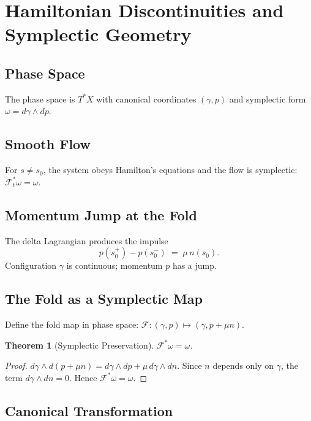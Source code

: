 \documentclass[12pt, oneside]{book}
\theoremstyle{plain}
\newtheorem{theorem}{Theorem}[section]
\theoremstyle{definition}
\theoremstyle{remark}
\begin{document}
\section{Hamiltonian Discontinuities and Symplectic Geometry}

\subsection{Phase Space}

The phase space is $T^*X$ with canonical coordinates $(\gamma, p)$
and symplectic form $\omega = d\gamma \wedge dp$.

\subsection{Smooth Flow}

For $s \ne s_0$, the system obeys Hamilton's equations and the flow
is symplectic: $\mathcal{F}_t^*\omega = \omega$.

\subsection{Momentum Jump at the Fold}

The delta Lagrangian produces the impulse
\[
p(s_0^+) - p(s_0^-) \;=\; \mu\,n(s_0).
\]
Configuration $\gamma$ is continuous; momentum $p$ has a jump.

\subsection{The Fold as a Symplectic Map}

Define the fold map in phase space:
$\mathcal{F} : (\gamma, p) \mapsto (\gamma, p + \mu n)$.

\begin{theorem}[Symplectic Preservation]
$\mathcal{F}^*\omega = \omega$.
\end{theorem}

\begin{proof}
$d\gamma \wedge d(p + \mu n) = d\gamma \wedge dp
  + \mu\,d\gamma \wedge dn$.
Since $n$ depends only on $\gamma$, the term
$d\gamma \wedge dn = 0$.
Hence $\mathcal{F}^*\omega = \omega$.
\end{proof}

\subsection{Canonical Transformation}
\end{document}
